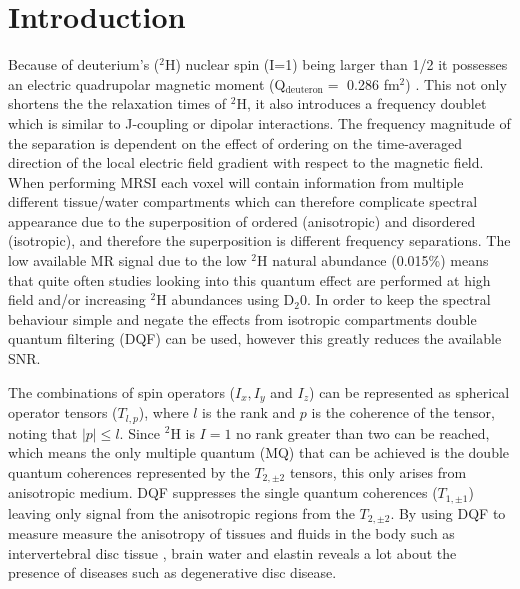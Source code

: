 \documentclass[class=article, crop=false]{standalone}
\begin{document}
 
\label{section:Quad}

\section{Introduction}

Because of deuterium's ($^2$H) nuclear spin (I=1) being larger than 1/2 it possesses an electric quadrupolar magnetic moment (Q$_{\text{deuteron}}=$ 0.286 fm$^2$) \cite{Stone2015NuclearData}. This not only shortens the the relaxation times of $^2$H, it also introduces a frequency doublet which is similar to J-coupling or dipolar interactions. The frequency magnitude of the separation is dependent on the effect of ordering on the time-averaged direction of the local electric field gradient with respect to the magnetic field\cite{Seelig1977DeuteriumMembranes, Eliav2016MultipleMRS}. When performing MRSI each voxel will contain information from multiple different tissue/water compartments which can therefore complicate spectral appearance due to the superposition of ordered (anisotropic) and disordered (isotropic), and therefore the superposition is different frequency separations. The low available MR signal due to the low $^2$H natural abundance (0.015\%) means that quite often studies looking into this quantum effect are performed at high field \cite{Gursan2022ResidualMuscle} and\cite{Ooms2015DoubleTissue}/or\cite{Damion2022DoubleLoading} increasing $^2$H abundances using D$_2$0. In order to keep the spectral behaviour simple and negate the effects from isotropic compartments double quantum filtering (DQF) can be used\cite{Sharf1995DetectionNMR-Spectroscopy, Perea20072HDisc}, however this greatly reduces the available SNR. 

The combinations of spin operators ($I_x, I_y$ and $I_z$) can be represented as spherical operator tensors ($T_{l,p}$), where $l$ is the rank and $p$ is the coherence of the tensor, noting that $|p| \le l$. Since $^2$H is $I=1$ no rank greater than two can be reached, which means the only multiple quantum (MQ) that can be achieved is the double quantum coherences represented by the $T_{2,\pm2}$ tensors, this only arises from anisotropic medium. DQF suppresses the single quantum coherences ($T_{1,\pm1}$) leaving only signal from the anisotropic regions from the $T_{2,\pm2}$. By using DQF to measure measure the anisotropy of tissues and fluids in the body such as intervertebral disc tissue \cite{Ooms2015DoubleTissue}, brain water\cite{Assaf1997InSpectroscopy} and elastin\cite{Sun2010InvestigationNMR} reveals a lot about the presence of diseases such as degenerative disc disease\cite{Ooms2015DoubleTissue}.
\end{document}
